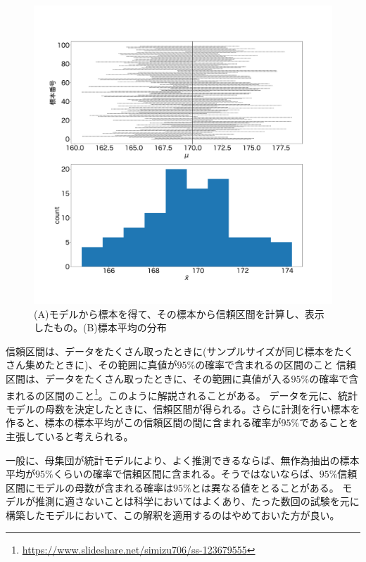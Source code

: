 \begin{figure}
\begin{center}
    \includegraphics[width=15cm]{./image/03_/confidence_interval_model_count.pdf}
    \caption{(A)モデルから標本を得て、その標本から信頼区間を計算し、表示したもの。(B)標本平均の分布}
    \label{fig:confidence_interval_sample}
  \end{center}
\end{figure}


\begin{SMbox}{信頼区間は、データをたくさん取ったときに(サンプルサイズが同じ標本をたくさん集めたときに)、その範囲に真値が$95\%$の確率で含まれるの区間のこと}
信頼区間は、データをたくさん取ったときに、その範囲に真値が入る$95\%$の確率で含まれるの区間のこと\footnote{\url{https://www.slideshare.net/simizu706/ss-123679555}}。このように解説されることがある。
データを元に、統計モデルの母数を決定したときに、信頼区間が得られる。さらに計測を行い標本を作ると、標本の標本平均がこの信頼区間の間に含まれる確率が$95\%$であることを主張していると考えられる。

一般に、母集団が統計モデルにより、よく推測できるならば、無作為抽出の標本平均が$95\%$くらいの確率で信頼区間に含まれる。そうではないならば、$95\%$信頼区間にモデルの母数が含まれる確率は$95\%$とは異なる値をとることがある。
モデルが推測に適さないことは科学においてはよくあり、たった数回の試験を元に構築したモデルにおいて、この解釈を適用するのはやめておいた方が良い。

\end{SMbox}


